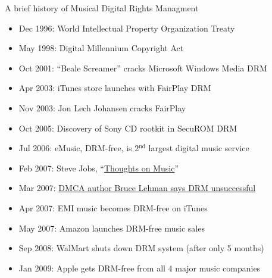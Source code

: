 \documentclass{beamer}
\begin{document}
\begin{frame}{A brief history of Musical Digital Rights Managment}
\begin{itemize}
\item Dec 1996: World Intellectual Property Organization Treaty
\item May 1998: Digital Millennium Copyright Act
\item Oct 2001: ``Beale Screamer'' cracks Microsoft Windows Media DRM
\item Apr 2003: iTunes store launches with FairPlay DRM
\item Nov 2003: Jon Lech Johansen cracks FairPlay
\item Oct 2005: Discovery of Sony CD rootkit in SecuROM DRM
\item Jul 2006: eMusic, DRM-free, is 2$^{\text{nd}}$ largest digital music service
\item Feb 2007: Steve Jobs, ``\href{http://www.apple.com/kr/hotnews/thoughtsonmusic/}{Thoughts on Music}''
\item Mar 2007: \href{http://www.michaelgeist.ca/2007/03/lehman-on-dmca/}{DMCA author Bruce Lehman says DRM unsuccessful}
\item Apr 2007: EMI music becomes DRM-free on iTunes
\item May 2007: Amazon launches DRM-free music sales
\item Sep 2008: WalMart shuts down DRM system (after only 5 months)
\item Jan 2009: Apple gets DRM-free from all 4 major music companies
\end{itemize}
\end{frame}
\end{document}
